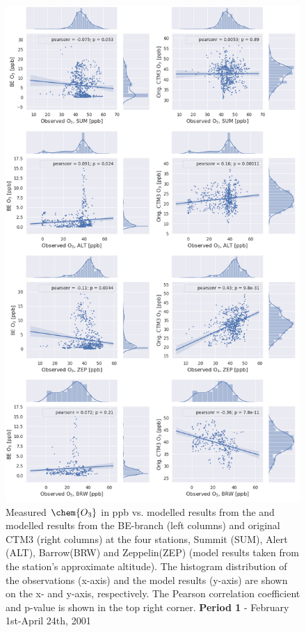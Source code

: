 \begin{figure}[ht]
    \centering
    \includegraphics[width = 0.8\linewidth]{Chapter6_Results/images/Orig_BE_comp/jointplot_FebApr_O3_2001.png}
    \caption{Measured $\chem{O_3}$ in ppb vs. modelled results from the and modelled results from the BE-branch (left columns) and original CTM3 (right columns) at the four stations, Summit (SUM), Alert (ALT), Barrow(BRW) and Zeppelin(ZEP) (model results taken from the station's approximate altitude). The histogram distribution of the observations (x-axis) and the model results (y-axis) are shown on the x- and y-axis, respectively. The Pearson correlation coefficient and p-value is shown in the top right corner. \textbf{Period 1} - February 1st-April 24th, 2001}
    \label{fig:joint_FebApr}
\end{figure}


